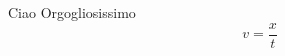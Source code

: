 \documentclass{beamer}
\begin{document}
	\begin{frame}{Ciao}
		Orgogliosissimo
		\begin{equation}
			v = \frac{x}{t}
		\end{equation}
	\end{frame}
\end{document}
